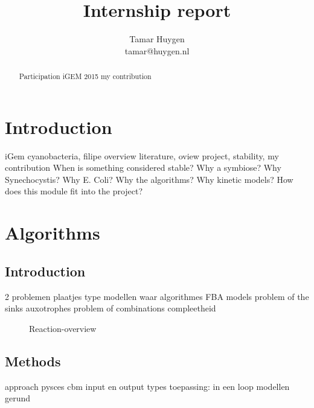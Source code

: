 \documentclass[10pt]{report}
\title{Internship report}
\author{Tamar Huygen \\ tamar@huygen.nl}
\begin{document}
\maketitle

\begin{abstract}
  Participation iGEM 2015 my contribution
\end{abstract}

\chapter{Introduction}
iGem cyanobacteria, filipe overview literature,
oview project, stability, my contribution
When is something considered stable?
Why a symbiose?
Why Synechocystis?
Why E. Coli?
Why the algorithms?
Why kinetic models?
How does this module fit into the project?

\chapter{Algorithms}

\begin{abstract}
  
\end{abstract}

\section{Introduction}
2 problemen
plaatjes
type modellen waar algorithmes
FBA models
problem of the sinks
auxotrophes
problem of combinations
compleetheid


\begin{figure}[hbtp]
  \centering
     
      \caption{Reaction-overview}
  \label{fig:reaction-overview}
\end{figure}



\section{Methods}
approach
pysces cbm
input en output types
toepassing: in een loop modellen gerund
\end{document}

